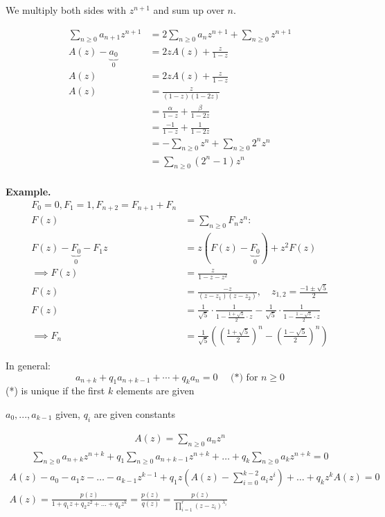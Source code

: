 We multiply both sides with $z^{n+1}$ and sum up over $n$.

\begin{align*}
\sum_{n≥0} a_{n+1} z^{n+1} &= 2 \sum_{n \geq 0} a_n z^{n+1} + \sum_{n\geq 0} z^{n+1} \\
A(z) - \underbrace{a_0}_{0} &= 2z A(z) + \frac{z}{1-z}\\
A(z) &= 2 z A(z) + \frac{z}{1-z}\\
A(z) &= \frac{z}{(1-z)(1-2z)} \\
    &= \frac{\alpha}{1-z} + \frac{\beta} {1-2z}\\
    &= \frac{-1}{1-z} + \frac{1}{1-2z} \\
    &= -\sum_{n\geq 0} z^n + \sum_{n\geq 0} 2^n z^n\\
    &= \sum_{n\geq 0} (2^n-1) z^n\\
\end{align*}

\textbf{Example.}
\begin{align*}
    F_0 = 0, F_1 = 1, F_{n+2} = F_{n+1} + F_n \\
    F(z) &= \sum_{n≥0} F_n z^n : \\
    F(z) - \underbrace{F_0}_{0} - F_1 z &= z \left( F(z) - \underbrace{F_0}_{0} \right) + z^2 F(z)\\
    \implies F(z) &= \frac{z}{1-z-z^2} \\
    F(z) &= \frac{-z}{(z-z_1) (z-z_2)},
        \quad z_{1,2} = \frac{-1 \pm \sqrt{5}}{2} \\
    F(z) &= \frac1{\sqrt{5}} \cdot \frac{1}{1- \frac{1 + \sqrt{5}}{2} \cdot z} - \frac{1}{\sqrt{5}} \cdot \frac{1}{1- \frac{1 - \sqrt{5}}{2} \cdot z}  \\
    \implies F_n &= \frac{1}{\sqrt{5}}
		\left( \left( \frac{1+ \sqrt 5}{2} \right)^n
		- \left( \frac{1-\sqrt{5}}{2} \right)^n
		\right)
\end{align*}


In general:
\[
    a_{n+k} + q_1 a_{n+k-1} + \cdots + q_k a_n = 0
    \quad  \text{ (*) for }n \geq 0
\]
(*) is unique if the first $k$ elements are given

$a_0, ..., a_{k-1}$ given, $q_i$ are given constants

\begin{align*}
A(z) = \sum_{n\geq 0} a_n z^n
\end{align*}
\begin{align*}
\sum_{n\geq 0} a_{n+k} z^{n+k} + q_1 \sum_{n\geq 0}  a_{n+k-1}z^{n+k} + \ldots + q_k \sum_{n\geq 0} a_k z^{n+k} = 0
\end{align*}
\begin{align*}
A(z) - a_0 - a_1 z - \ldots - a_{k-1} z^{k-1} + q_1 z \left( A(z) - \sum_{i=0}^{k-2} a_i z^i \right) + \ldots + q_k z^k A(z) = 0\\
A(z) = \frac{ p(z) }{ 1 + q_1 z + q_2 z^2 + \ldots + q_k z^k } = \frac{p(z)}{q(z)} = \frac{p(z)}{\prod_{i=1}^{r} (z - z_i)^{\lambda_i}}
\end{align*}


